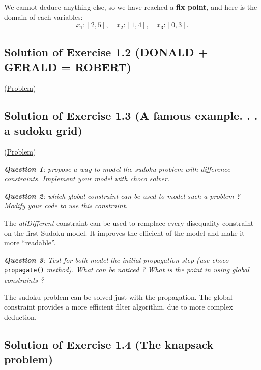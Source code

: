 We cannot deduce anything else, so we have reached a \textbf{fix point}, and here is the domain of each variables:
$$x_{1} : [2,5],\quad x_{2} : [1,4],\quad x_{3} : [0,3].$$


\subsection{Solution of Exercise 1.2 (DONALD + GERALD = ROBERT)}\label{solutions:solutionofexercise1.2}\hypertarget{solutions:solutionofexercise1.2}{}

(\hyperlink{exercises:exercise1.2}{Problem})



\subsection{Solution of Exercise 1.3 (A famous example. . . a sudoku grid)}\label{solutions:solutionofexercise1.3}\hypertarget{solutions:solutionofexercise1.3}{}

(\hyperlink{exercises:exercise1.3}{Problem})

\noindent\emph{\textbf{Question 1}: propose a way to model the sudoku problem with difference constraints. Implement your model with choco solver.}



\noindent\emph{\textbf{Question 2}: which global constraint can be used to model such a problem ? Modify your code to use this constraint.}

The \emph{allDifferent} constraint can be used to remplace every disequality constraint on the first Sudoku model. It improves the efficient of the model and make it more ``readable''.


\noindent\emph{\textbf{Question 3}: Test for both model the initial propagation step (use choco} \texttt{propagate()} \emph{method). What can be noticed ? What is the point in using global constraints ?}

The sudoku problem can be solved just with the propagation. 
The global constraint provides a more efficient filter algorithm, due to more complex deduction.

\subsection{Solution of Exercise 1.4 (The knapsack problem)}\label{solutions:solutionofexercise1.4}\hypertarget{solutions:solutionofexercise1.4}{}

